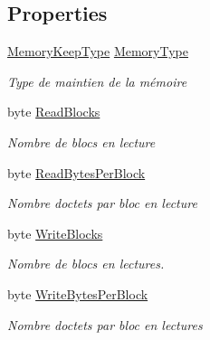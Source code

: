 \subsection*{Properties}
\begin{DoxyCompactItemize}
\item 
\mbox{\hyperlink{class_device_library_1_1_c_memory_storage_a212a4301a9ee4074c52046fc8b36fb7a}{Memory\+Keep\+Type}} \mbox{\hyperlink{class_device_library_1_1_c_memory_storage_a2c8371a87602ea9abac9191c69ba0c8e}{Memory\+Type}}
\begin{DoxyCompactList}\small\item\em Type de maintien de la mémoire \end{DoxyCompactList}\item 
byte \mbox{\hyperlink{class_device_library_1_1_c_memory_storage_a5149e18293f087e168b57cec9278357b}{Read\+Blocks}}
\begin{DoxyCompactList}\small\item\em Nombre de blocs en lecture \end{DoxyCompactList}\item 
byte \mbox{\hyperlink{class_device_library_1_1_c_memory_storage_ae098f13e143c3bcc40d3c68ee7d93297}{Read\+Bytes\+Per\+Block}}
\begin{DoxyCompactList}\small\item\em Nombre d\textquotesingle{}octets par bloc en lecture \end{DoxyCompactList}\item 
byte \mbox{\hyperlink{class_device_library_1_1_c_memory_storage_aad3f07ff5ba905a568178e1418adbccf}{Write\+Blocks}}
\begin{DoxyCompactList}\small\item\em Nombre de blocs en lectures. \end{DoxyCompactList}\item 
byte \mbox{\hyperlink{class_device_library_1_1_c_memory_storage_a4a4f80a523648f2987095bd16740816f}{Write\+Bytes\+Per\+Block}}
\begin{DoxyCompactList}\small\item\em Nombre d\textquotesingle{}octets par bloc en lectures \end{DoxyCompactList}\end{DoxyCompactItemize}


